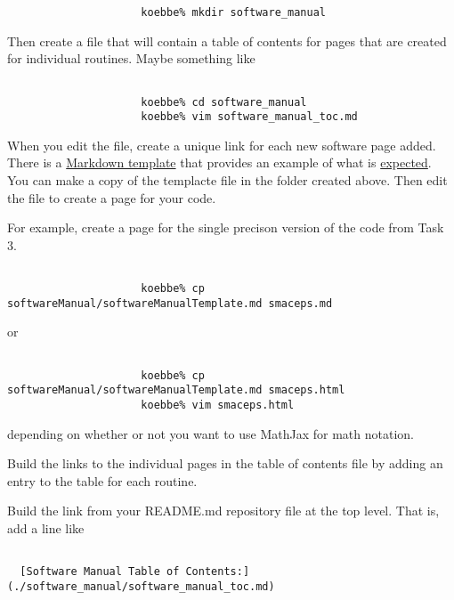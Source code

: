 \documentclass[10pt,fleqn]{article}
\begin{document}
\begin{trivlist}
\begin{trivlist}
\begin{verbatim}
                     koebbe% mkdir software_manual

                 \end{verbatim}
                 Then create a file that will contain a table of contents for
                 pages that are created for individual routines. Maybe something
                 like
                 \begin{verbatim}

                     koebbe% cd software_manual
                     koebbe% vim software_manual_toc.md

                 \end{verbatim}
                 When you edit the file, create a unique link for each new
                 software page added. There is a
                 \href{../../../softwareManual/softwareManualTemplate.md}
                 {Markdown template} that provides an example of what is
                 \href{../audio/tps_cover.wav}{expected}. You can make a copy of
                 the templacte file in the folder created above. Then edit the
                 file to create a page for your code.
 
                 For example, create a page for the single precison
                 version of the code from Task 3.
                 \begin{verbatim}

                     koebbe% cp softwareManual/softwareManualTemplate.md smaceps.md

                 \end{verbatim}
                 or
                 \begin{verbatim}

                     koebbe% cp softwareManual/softwareManualTemplate.md smaceps.html
                     koebbe% vim smaceps.html

                 \end{verbatim}
                 depending on whether or not you want to use MathJax for math
                 notation.
          \item Build the links to the individual pages in the table of contents
                file by adding an entry to the table for each routine.
          \item Build the link from your README.md repository file at the top
                level. That is, add a line like
                \begin{verbatim}

  [Software Manual Table of Contents:](./software_manual/software_manual_toc.md)


\end{verbatim}
\end{trivlist}
\end{trivlist}
\end{document}
